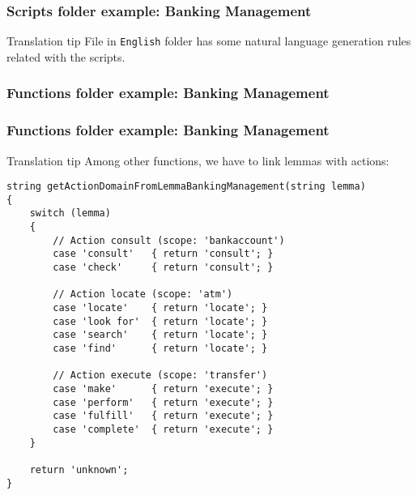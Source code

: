 \documentclass[11pt]{beamer}
\begin{document}
\begin{frame}
\frametitle{Scripts folder example: Banking Management}
	\pause
	\vspace{10pt}
	\begin{block}{Translation tip}
		File in \texttt{English} folder has some natural language generation rules related with the scripts.
	\end{block}
\end{frame}

\begin{frame}[fragile]
\frametitle{Functions folder example: Banking Management}
\end{frame}

\begin{frame}[fragile]
\frametitle{Functions folder example: Banking Management}
	\begin{block}{Translation tip}
	Among other functions, we have to link lemmas with actions:
		\tiny
		\begin{lstlisting}[language=lekta]
string getActionDomainFromLemmaBankingManagement(string lemma)
{
	switch (lemma) 
	{
		// Action consult (scope: 'bankaccount')
		case 'consult'   { return 'consult'; }
		case 'check'     { return 'consult'; }
		
		// Action locate (scope: 'atm')
		case 'locate'    { return 'locate'; }
		case 'look for'  { return 'locate'; }
		case 'search'    { return 'locate'; }
		case 'find'      { return 'locate'; }

		// Action execute (scope: 'transfer')
		case 'make'      { return 'execute'; }
		case 'perform'   { return 'execute'; }
		case 'fulfill'   { return 'execute'; }
		case 'complete'  { return 'execute'; }
	}

	return 'unknown';
}
		\end{lstlisting}
	\end{block}
\end{frame}
\end{document}
